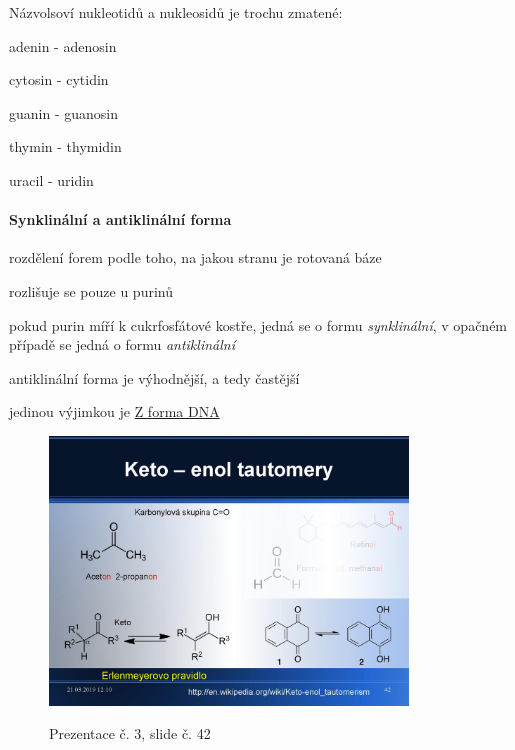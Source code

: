 \documentclass[DIV=8]{scrreprt}
\begin{document}
Názvolsoví nukleotidů a nukleosidů je trochu zmatené:
\begin{myItemize}[nosep]
    \item adenin - adenosin
    \item cytosin - cytidin
    \item guanin - guanosin
    \item thymin - thymidin
    \item uracil - uridin
\end{myItemize}



\paragraph{Synklinální a antiklinální forma}
\begin{myItemize}[nosep]
    \item rozdělení forem podle toho, na jakou stranu je rotovaná báze
    \item rozlišuje se pouze u purinů
    \item pokud purin míří k cukrfosfátové kostře, jedná se o formu \emph{synklinální}, v opačném případě se jedná o formu \emph{antiklinální}
    \item antiklinální forma je výhodnější, a tedy častější
\begin{myItemize}[nosep]
    \item jedinou výjimkou je \hyperref[Konformace Z]{Z forma DNA}
\end{myItemize}

\end{myItemize}




\begin{figure}
    \caption{Prezentace č. 3, slide č. 42}
    \includegraphics[width=0.85\textwidth]{slides-3/slide-42.jpg}
    \centering
    \label{slides-3-slide-42}
\end{figure}
\end{document}
